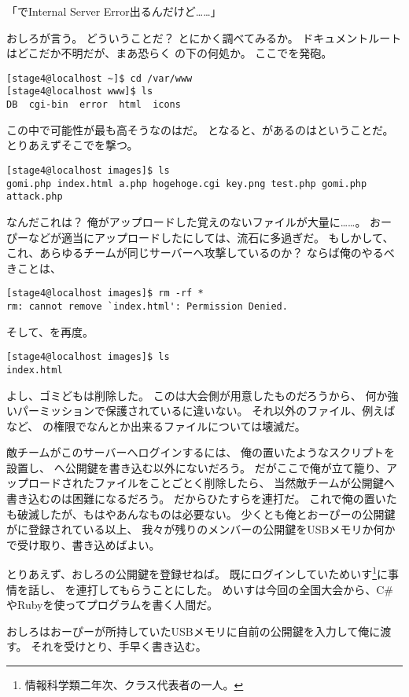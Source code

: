 \begin{multicols}{2}
「でInternal Server Error出るんだけど……」

おしろが言う。
どういうことだ？
とにかく調べてみるか。
ドキュメントルートはどこだか不明だが、まあ恐らく
の下の何処か。
ここでを発砲。

\begin{lstlisting}
[stage4@localhost ~]$ cd /var/www
[stage4@localhost www]$ ls
DB  cgi-bin  error  html  icons
\end{lstlisting}

この中で可能性が最も高そうなのはだ。
となると、があるのはということだ。
とりあえずそこでを撃つ。

\begin{lstlisting}
[stage4@localhost images]$ ls
gomi.php index.html a.php hogehoge.cgi key.png test.php gomi.php attack.php 
\end{lstlisting}

なんだこれは？
俺がアップロードした覚えのないファイルが大量に……。
おーぴーなどが適当にアップロードしたにしては、流石に多過ぎだ。
もしかして、これ、あらゆるチームが同じサーバーへ攻撃しているのか？
ならば俺のやるべきことは、

\begin{lstlisting}
[stage4@localhost images]$ rm -rf *
rm: cannot remove `index.html': Permission Denied.
\end{lstlisting}

そして、を再度。

\begin{lstlisting}
[stage4@localhost images]$ ls
index.html
\end{lstlisting}

よし、ゴミどもは削除した。
このは大会側が用意したものだろうから、
何か強いパーミッションで保護されているに違いない。
それ以外のファイル、例えばなど、
の権限でなんとか出来るファイルについては壊滅だ。

敵チームがこのサーバーへログインするには、
俺の置いたようなスクリプトを設置し、
へ公開鍵を書き込む以外にないだろう。
だがここで俺が立て籠り、アップロードされたファイルをことごとく削除したら、
当然敵チームが公開鍵へ書き込むのは困難になるだろう。
だからひたすらを連打だ。
これで俺の置いたも破滅したが、もはやあんなものは必要ない。
少くとも俺とおーぴーの公開鍵がに登録されている以上、
我々が残りのメンバーの公開鍵をUSBメモリか何かで受け取り、書き込めばよい。

とりあえず、おしろの公開鍵を登録せねば。
既にログインしていためいす\footnote{情報科学類二年次、クラス代表者の一人。}に事情を話し、
を連打してもらうことにした。
めいすは今回の全国大会から、C\#やRubyを使ってプログラムを書く人間だ。

おしろはおーぴーが所持していたUSBメモリに自前の公開鍵を入力して俺に渡す。
それを受けとり、手早く書き込む。

\end{multicols}

